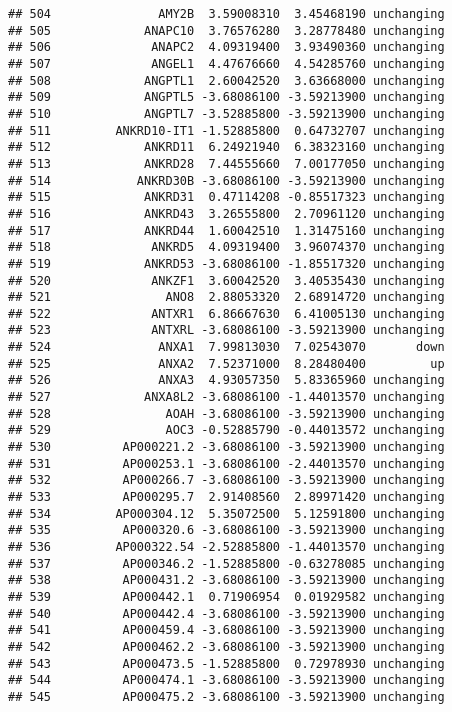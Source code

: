 \documentclass[]{article}
\begin{document}
\begin{verbatim}
## 504               AMY2B  3.59008310  3.45468190 unchanging
## 505             ANAPC10  3.76576280  3.28778480 unchanging
## 506              ANAPC2  4.09319400  3.93490360 unchanging
## 507              ANGEL1  4.47676660  4.54285760 unchanging
## 508             ANGPTL1  2.60042520  3.63668000 unchanging
## 509             ANGPTL5 -3.68086100 -3.59213900 unchanging
## 510             ANGPTL7 -3.52885800 -3.59213900 unchanging
## 511         ANKRD10-IT1 -1.52885800  0.64732707 unchanging
## 512             ANKRD11  6.24921940  6.38323160 unchanging
## 513             ANKRD28  7.44555660  7.00177050 unchanging
## 514            ANKRD30B -3.68086100 -3.59213900 unchanging
## 515             ANKRD31  0.47114208 -0.85517323 unchanging
## 516             ANKRD43  3.26555800  2.70961120 unchanging
## 517             ANKRD44  1.60042510  1.31475160 unchanging
## 518              ANKRD5  4.09319400  3.96074370 unchanging
## 519             ANKRD53 -3.68086100 -1.85517320 unchanging
## 520              ANKZF1  3.60042520  3.40535430 unchanging
## 521                ANO8  2.88053320  2.68914720 unchanging
## 522              ANTXR1  6.86667630  6.41005130 unchanging
## 523              ANTXRL -3.68086100 -3.59213900 unchanging
## 524               ANXA1  7.99813030  7.02543070       down
## 525               ANXA2  7.52371000  8.28480400         up
## 526               ANXA3  4.93057350  5.83365960 unchanging
## 527             ANXA8L2 -3.68086100 -1.44013570 unchanging
## 528                AOAH -3.68086100 -3.59213900 unchanging
## 529                AOC3 -0.52885790 -0.44013572 unchanging
## 530          AP000221.2 -3.68086100 -3.59213900 unchanging
## 531          AP000253.1 -3.68086100 -2.44013570 unchanging
## 532          AP000266.7 -3.68086100 -3.59213900 unchanging
## 533          AP000295.7  2.91408560  2.89971420 unchanging
## 534         AP000304.12  5.35072500  5.12591800 unchanging
## 535          AP000320.6 -3.68086100 -3.59213900 unchanging
## 536         AP000322.54 -2.52885800 -1.44013570 unchanging
## 537          AP000346.2 -1.52885800 -0.63278085 unchanging
## 538          AP000431.2 -3.68086100 -3.59213900 unchanging
## 539          AP000442.1  0.71906954  0.01929582 unchanging
## 540          AP000442.4 -3.68086100 -3.59213900 unchanging
## 541          AP000459.4 -3.68086100 -3.59213900 unchanging
## 542          AP000462.2 -3.68086100 -3.59213900 unchanging
## 543          AP000473.5 -1.52885800  0.72978930 unchanging
## 544          AP000474.1 -3.68086100 -3.59213900 unchanging
## 545          AP000475.2 -3.68086100 -3.59213900 unchanging

\end{verbatim}
\end{document}
